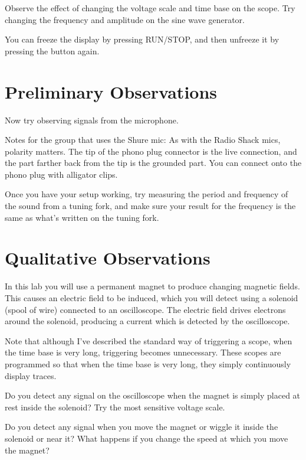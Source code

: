 Observe the effect of changing the voltage scale and time
base on the scope. Try changing the frequency and amplitude
on the sine wave generator.

You can freeze the display by pressing RUN/STOP, and then
unfreeze it by pressing the button again.

\section{Preliminary Observations}

Now try observing signals from the microphone.

Notes for the group that uses the Shure mic: As with the Radio Shack
mics, polarity matters. The tip of the phono plug connector is the
live connection, and the part farther back from the tip is the
grounded part. You can connect onto the phono plug with alligator
clips.

Once you have your setup working, try measuring the period
and frequency of the sound from a tuning fork, and make sure
your result for the frequency is the same as what's
written on the tuning fork.
\section{Qualitative Observations}

In this lab you will use a permanent magnet to produce
changing magnetic fields. This causes an electric field to
be induced, which you will detect using a solenoid (spool of
wire) connected to an oscilloscope. The electric field
drives electrons around the solenoid, producing a current
which is detected by the oscilloscope.

Note that although I've described the standard way of triggering
a scope, when the time base is very long, triggering becomes unnecessary.
These scopes are programmed so that when the time base is very long,
they simply continuously display traces.


Do you detect any signal on the oscilloscope when the magnet
is simply placed at rest inside the solenoid? Try the most
sensitive voltage scale.


Do you detect any signal when you move the magnet or wiggle
it inside the solenoid or near it? What happens if you
change the speed at which you move the magnet?

